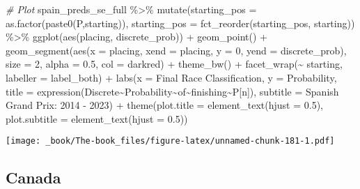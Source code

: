 \documentclass[
]{book}
\newenvironment{Shaded}{\begin{snugshade}}{\end{snugshade}}
\newcommand{\AttributeTok}[1]{\textcolor[rgb]{0.77,0.63,0.00}{#1}}
\newcommand{\CommentTok}[1]{\textcolor[rgb]{0.56,0.35,0.01}{\textit{#1}}}
\newcommand{\DecValTok}[1]{\textcolor[rgb]{0.00,0.00,0.81}{#1}}
\newcommand{\FloatTok}[1]{\textcolor[rgb]{0.00,0.00,0.81}{#1}}
\newcommand{\FunctionTok}[1]{\textcolor[rgb]{0.00,0.00,0.00}{#1}}
\newcommand{\NormalTok}[1]{#1}
\newcommand{\SpecialCharTok}[1]{\textcolor[rgb]{0.00,0.00,0.00}{#1}}
\newcommand{\StringTok}[1]{\textcolor[rgb]{0.31,0.60,0.02}{#1}}
\begin{document}
\begin{Shaded}
\begin{Highlighting}[]
\CommentTok{\# Plot}
\NormalTok{spain\_preds\_se\_full }\SpecialCharTok{\%\textgreater{}\%}
  \FunctionTok{mutate}\NormalTok{(}\AttributeTok{starting\_pos =} \FunctionTok{as.factor}\NormalTok{(}\FunctionTok{paste0}\NormalTok{(}\StringTok{\textquotesingle{}P\textquotesingle{}}\NormalTok{,starting)),}
         \AttributeTok{starting\_pos =} \FunctionTok{fct\_reorder}\NormalTok{(starting\_pos, starting)) }\SpecialCharTok{\%\textgreater{}\%}
  \FunctionTok{ggplot}\NormalTok{(}\FunctionTok{aes}\NormalTok{(placing, discrete\_prob)) }\SpecialCharTok{+}
  \FunctionTok{geom\_point}\NormalTok{() }\SpecialCharTok{+}
  \FunctionTok{geom\_segment}\NormalTok{(}\FunctionTok{aes}\NormalTok{(}\AttributeTok{x =}\NormalTok{ placing, }\AttributeTok{xend =}\NormalTok{ placing, }\AttributeTok{y =} \DecValTok{0}\NormalTok{, }\AttributeTok{yend =}\NormalTok{ discrete\_prob),}
               \AttributeTok{size =} \DecValTok{2}\NormalTok{, }\AttributeTok{alpha =} \FloatTok{0.5}\NormalTok{, }\AttributeTok{col =} \StringTok{\textquotesingle{}darkred\textquotesingle{}}\NormalTok{) }\SpecialCharTok{+}
  \FunctionTok{theme\_bw}\NormalTok{() }\SpecialCharTok{+}
  \FunctionTok{facet\_wrap}\NormalTok{(}\SpecialCharTok{\textasciitilde{}}\NormalTok{ starting, }\AttributeTok{labeller =}\NormalTok{ label\_both) }\SpecialCharTok{+}
  \FunctionTok{labs}\NormalTok{(}\AttributeTok{x =} \StringTok{\textquotesingle{}Final Race Classification\textquotesingle{}}\NormalTok{,}
       \AttributeTok{y =} \StringTok{\textquotesingle{}Probability\textquotesingle{}}\NormalTok{,}
       \AttributeTok{title =} \FunctionTok{expression}\NormalTok{(Discrete}\SpecialCharTok{\textasciitilde{}}\NormalTok{Probability}\SpecialCharTok{\textasciitilde{}}\NormalTok{of}\SpecialCharTok{\textasciitilde{}}\NormalTok{finishing}\SpecialCharTok{\textasciitilde{}}\NormalTok{P[n]),}
       \AttributeTok{subtitle =} \StringTok{\textquotesingle{}Spanish Grand Prix: 2014 {-} 2023\textquotesingle{}}\NormalTok{) }\SpecialCharTok{+}
  \FunctionTok{theme}\NormalTok{(}\AttributeTok{plot.title =} \FunctionTok{element\_text}\NormalTok{(}\AttributeTok{hjust =} \FloatTok{0.5}\NormalTok{),}
        \AttributeTok{plot.subtitle =} \FunctionTok{element\_text}\NormalTok{(}\AttributeTok{hjust =} \FloatTok{0.5}\NormalTok{)) }
\end{Highlighting}
\end{Shaded}

\texttt{[image: \_book/The-book\_files/figure-latex/unnamed-chunk-181-1.pdf]}

\hypertarget{canada}{%
\subsection{Canada}\label{canada}}
\end{document}
